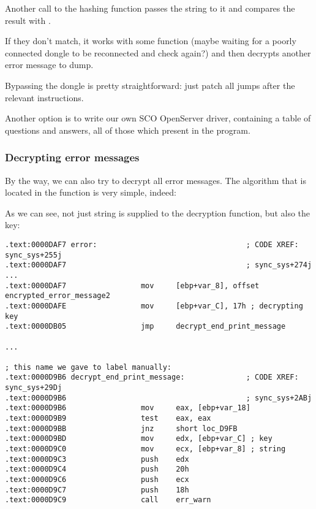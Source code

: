 Another call to the  hashing function passes the
 string to it and compares the result with
 \AndENRU {}.

If they don't match, it works with some  
function (maybe waiting for a poorly
connected dongle to be reconnected and check again?) and then decrypts another error message to dump.



Bypassing the dongle is pretty straightforward: just patch all jumps after the relevant \CMP instructions.


Another option is to write our own SCO OpenServer driver, containing a table of questions and answers, all of those which present in the program.

\subsubsection{Decrypting error messages}

By the way, we can also 
try to decrypt all error messages.
The algorithm that is located in the  
function is very simple, indeed:



As we can see, 
not just string is supplied to the decryption function, but also the key:

\begin{lstlisting}
.text:0000DAF7 error:                                  ; CODE XREF: sync_sys+255j
.text:0000DAF7                                         ; sync_sys+274j ...
.text:0000DAF7                 mov     [ebp+var_8], offset encrypted_error_message2
.text:0000DAFE                 mov     [ebp+var_C], 17h ; decrypting key
.text:0000DB05                 jmp     decrypt_end_print_message

...

; this name we gave to label manually:
.text:0000D9B6 decrypt_end_print_message:              ; CODE XREF: sync_sys+29Dj
.text:0000D9B6                                         ; sync_sys+2ABj
.text:0000D9B6                 mov     eax, [ebp+var_18]
.text:0000D9B9                 test    eax, eax
.text:0000D9BB                 jnz     short loc_D9FB
.text:0000D9BD                 mov     edx, [ebp+var_C] ; key
.text:0000D9C0                 mov     ecx, [ebp+var_8] ; string
.text:0000D9C3                 push    edx
.text:0000D9C4                 push    20h
.text:0000D9C6                 push    ecx
.text:0000D9C7                 push    18h
.text:0000D9C9                 call    err_warn
\end{lstlisting}

